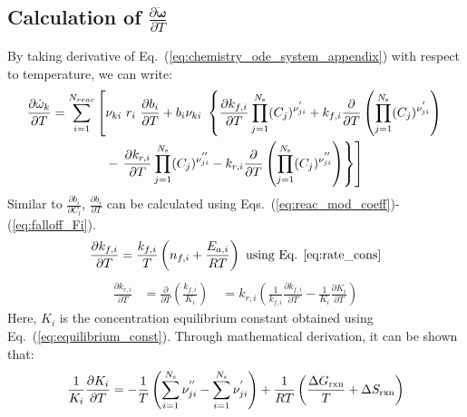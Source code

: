 \subsection*{Calculation of $\frac{\partial \mathbf{\dot{\omega}}}{\partial T}$}
By taking derivative of Eq.~(\ref{eq:chemistry_ode_system_appendix}) with respect to temperature, we can write:
\begin{multline}\label{eq:Jac2nd}
\frac{\partial \dot{\omega}_k}{\partial T} = \sum_{i=1}^{N_{reac}} \left[ \nu_{ki} \ r_i \ \frac{\partial b_i}{\partial T} +  b_i \nu_{ki} \  \left\{  \frac{\partial k_{f,i}}{\partial T} \prod_{j=1}^{N_{\rm s}} (C_j)^{{\nu}_{ji}^{'}}  + k_{f,i} \frac{\partial}{\partial T} \left( \prod_{j=1}^{N_{\rm s}} (C_j)^{{\nu}_{ji}^{'}}  \right) \right. \right. \\
- \left. \left. \frac{\partial k_{r,i}}{\partial T} \prod_{j=1}^{N_{\rm s}} (C_j)^{{\nu}_{ji}^{''}}  - k_{r,i} \frac{\partial}{\partial T} \left( \prod_{j=1}^{N_{\rm s}} (C_j)^{{\nu}_{ji}^{''}}  \right) \right\} \right]
\end{multline}
Similar to $\frac{\partial b_i}{\partial C_l}$, $\frac{\partial b_i}{\partial T}$ can be calculated using Eqs.~(\ref{eq:reac_mod_coeff})-(\ref{eq:falloff_Fi}).
\begin{equation} \label{eq:kfTmpDerivative}
\frac{\partial k_{f,i}}{\partial T} = \frac{k_{f,i}}{T} \left( n_{f,i} + \frac{E_{a,i}}{RT} \right) \ \text{using Eq. \ref{eq:rate_cons}}
\end{equation}
\begin{equation}\label{eq:krTmpDerivative}
\begin{aligned}
\frac{\partial k_{r,i}}{\partial T} &= \frac{\partial}{\partial T} \left( \frac{k_{f,i}}{K_i}  \right) \
&= k_{r,i} \left( \frac{1}{k_{f,i}} \frac{\partial k_{f,i}}{\partial T} - \frac{1}{K_i} \frac{\partial K_i}{\partial T} \right)
\end{aligned}
\end{equation}
Here, $K_i$ is the concentration equilibrium constant obtained using Eq.~(\ref{eq:equilibrium_const}). Through mathematical derivation, it can be shown that:
\begin{equation}\label{eq:EqConstTmpDerivative}
\begin{aligned}
\frac{1}{K_i} \frac{\partial K_i}{\partial T} = -\frac{1}{T} \left( \sum_{i=1}^{N_{\rm s}} {\nu}_{ji}^{''} -  \sum_{i=1}^{N_{\rm s}} {\nu}_{ji}^{'}  \right) + \frac{1}{R T} \left(  \frac{\Delta G_{\mathrm{rxn}}}{T} + \Delta S_{\mathrm{rxn}}   \right)
\end{aligned}
\end{equation}
